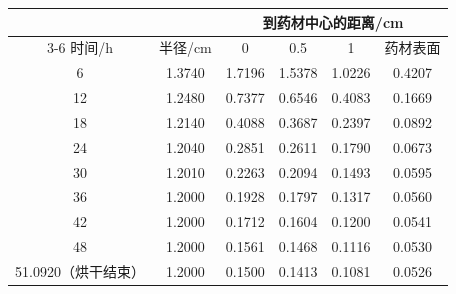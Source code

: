 \begin{tabular}{cccccc}
\toprule
 & & \multicolumn{4}{c}{到药材中心的距离/cm} \\
\cmidrule(lr){3-6}
时间/h & 半径/cm & 0 & 0.5 & 1 & 药材表面 \\
\midrule
6 & 1.3740 & 1.7196 & 1.5378 & 1.0226 & 0.4207 \\
12 & 1.2480 & 0.7377 & 0.6546 & 0.4083 & 0.1669 \\
18 & 1.2140 & 0.4088 & 0.3687 & 0.2397 & 0.0892 \\
24 & 1.2040 & 0.2851 & 0.2611 & 0.1790 & 0.0673 \\
30 & 1.2010 & 0.2263 & 0.2094 & 0.1493 & 0.0595 \\
36 & 1.2000 & 0.1928 & 0.1797 & 0.1317 & 0.0560 \\
42 & 1.2000 & 0.1712 & 0.1604 & 0.1200 & 0.0541 \\
48 & 1.2000 & 0.1561 & 0.1468 & 0.1116 & 0.0530 \\
51.0920（烘干结束） & 1.2000 & 0.1500 & 0.1413 & 0.1081 & 0.0526 \\
\bottomrule
\end{tabular}
